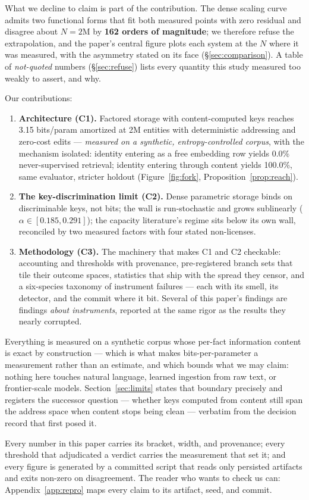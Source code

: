 What we decline to claim is part of the contribution. The dense scaling curve admits two functional forms that fit both measured points with zero residual and disagree about $N = 2$M by \textbf{162 orders of magnitude}; we therefore refuse the extrapolation, and the paper's central figure plots each system at the $N$ where it was measured, with the asymmetry stated on its face (\S\ref{sec:comparison}). A table of \emph{not-quoted} numbers (\S\ref{sec:refuse}) lists every quantity this study measured too weakly to assert, and why.

Our contributions:
\begin{enumerate}
\item \textbf{Architecture (C1).} Factored storage with content-computed keys reaches 3.15 bits/param amortized at 2M entities with deterministic addressing and zero-cost edits --- \emph{measured on a synthetic, entropy-controlled corpus}, with the mechanism isolated: identity entering as a free embedding row yields 0.0\% never-supervised retrieval; identity entering through content yields 100.0\%, same evaluator, stricter holdout (Figure~\ref{fig:fork}, Proposition~\ref{prop:reach}).
\item \textbf{The key-discrimination limit (C2).} Dense parametric storage binds on discriminable keys, not bits; the wall is run-stochastic and grows sublinearly ($\alpha \in [0.185, 0.291]$); the capacity literature's regime sits below its own wall, reconciled by two measured factors with four stated non-licenses.
\item \textbf{Methodology (C3).} The machinery that makes C1 and C2 checkable: accounting and thresholds with provenance, pre-registered branch sets that tile their outcome spaces, statistics that ship with the spread they censor, and a six-species taxonomy of instrument failures --- each with its smell, its detector, and the commit where it bit. Several of this paper's findings are findings \emph{about instruments}, reported at the same rigor as the results they nearly corrupted.
\end{enumerate}

Everything is measured on a synthetic corpus whose per-fact information content is exact by construction --- which is what makes bits-per-parameter a measurement rather than an estimate, and which bounds what we may claim: nothing here touches natural language, learned ingestion from raw text, or frontier-scale models. Section~\ref{sec:limits} states that boundary precisely and registers the successor question --- whether keys computed from content still span the address space when content stops being clean --- verbatim from the decision record that first posed it.

Every number in this paper carries its bracket, width, and provenance; every threshold that adjudicated a verdict carries the measurement that set it; and every figure is generated by a committed script that reads only persisted artifacts and exits non-zero on disagreement. The reader who wants to check us can: Appendix~\ref{app:repro} maps every claim to its artifact, seed, and commit.
